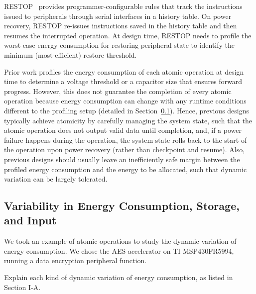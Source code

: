 RESTOP~\cite{rodriguez2018restop} provides programmer-configurable rules that track the instructions issued to peripherals through serial interfaces in a history table.
On power recovery, RESTOP re-issues instructions saved in the history table and then resumes the interrupted operation. 
At design time, RESTOP needs to profile the worst-case energy consumption for restoring peripheral state to identify the minimum (most-efficient) restore threshold. 




Prior work profiles the energy consumption of each atomic operation at design time to determine a voltage threshold or a capacitor size that ensures forward progress. 
However, this does not guarantee the completion of every atomic operation because energy consumption can change with any runtime conditions different to the profiling setup (detailed in Section~\ref{subsec:dynamic_energy_consumption}). 
Hence, previous designs typically achieve atomicity by carefully managing the system state, such that the atomic operation does not output valid data until completion, and, if a power failure happens during the operation, the system state rolls back to the start of the operation upon power recovery (rather than checkpoint and resume). 
Also, previous designs should usually leave an inefficiently safe margin between the profiled energy consumption and the energy to be allocated, such that dynamic variation can be largely tolerated. 








\subsection{Variability in Energy Consumption, Storage, and Input} \label{subsec:dynamic_energy_consumption}


We took an example of atomic operations to study the dynamic variation of energy consumption. We chose the AES accelerator on TI MSP430FR5994, running a data encryption peripheral function. 

Explain each kind of dynamic variation of energy consumption, as listed in Section I-A.

